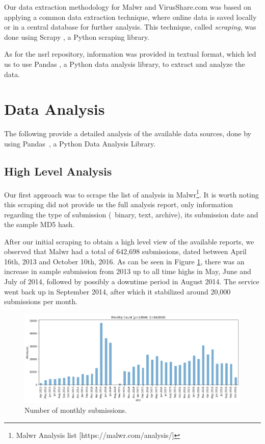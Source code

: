 Our data extraction methodology for Malwr and VirusShare.com was based on applying a common data extraction technique, where online data is saved locally or in a central database for further analysis. This technique, called \textit{scraping}, was done using Scrapy \cite{tool:scrapy}, a Python scraping library.

As for the \gls{nsrl} repository, information was provided in textual format, which led us to use Pandas \cite{tool:pandas}, a Python data analysis library, to extract and analyze the data.


\section{Data Analysis}
\label{section:data_analysis}

The following provide a detailed analysis of the available data sources, done by using Pandas~\cite{tool:pandas}, a Python Data Analysis Library.

\subsection{High Level Analysis}
\label{subsection:high_level_analysis}

Our first approach was to scrape the list of analysis in Malwr\footnote{Malwr Analysis list [https://malwr.com/analysis/]}.
It is worth noting this scraping did not provide us the full analysis report, only information regarding the type of submission (\eg\ binary, text, archive), its submission date and the sample MD5 hash.

After our initial scraping to obtain a high level view of the available reports, we observed that Malwr had a total of 642,698 submissions, dated between April 16th, 2013 and October 10th, 2016. As can be seen in Figure \ref{fig:samples_count}, there was an increase in sample submission from 2013 up to all time highs in May, June and July of 2014, followed by possibly a downtime period in August 2014.
The service went back up in September 2014, after which it stabilized around 20,000 submissions per month.

\begin{figure}[!htb]
	\centering
	\includegraphics[width=\textwidth]{Figures/samples_count.png}
	\caption[Number of monthly submissions.]{Number of monthly submissions.}
	\label{fig:samples_count}
\end{figure}


